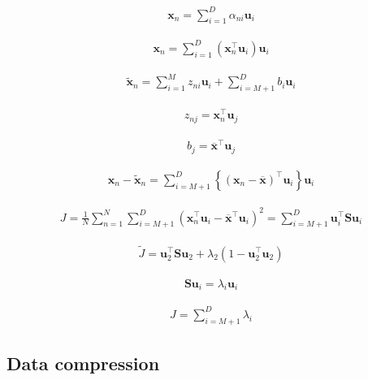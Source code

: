 \documentclass{article}
\begin{document}
\begin{align*}
\mathbf{x}_{n}=\sum_{i=1}^{D} \alpha_{n i} \mathbf{u}_{i} \tag{16.8}
\end{align*}

\begin{align*}
\mathbf{x}_{n}=\sum_{i=1}^{D}\left(\mathbf{x}_{n}^{\top} \mathbf{u}_{i}\right) \mathbf{u}_{i} \tag{16.9}
\end{align*}

\begin{align*}
\widetilde{\mathbf{x}}_{n}=\sum_{i=1}^{M} z_{n i} \mathbf{u}_{i}+\sum_{i=M+1}^{D} b_{i} \mathbf{u}_{i} \tag{16.10}
\end{align*}

\begin{align*}
z_{n j}=\mathbf{x}_{n}^{\top} \mathbf{u}_{j} \tag{16.12}
\end{align*}

\begin{align*}
b_{j}=\overline{\mathbf{x}}^{\top} \mathbf{u}_{j} \tag{16.13}
\end{align*}

\begin{align*}
\mathbf{x}_{n}-\widetilde{\mathbf{x}}_{n}=\sum_{i=M+1}^{D}\left\{\left(\mathbf{x}_{n}-\overline{\mathbf{x}}\right)^{\top} \mathbf{u}_{i}\right\} \mathbf{u}_{i} \tag{16.14}
\end{align*}

\begin{align*}
J=\frac{1}{N} \sum_{n=1}^{N} \sum_{i=M+1}^{D}\left(\mathbf{x}_{n}^{\top} \mathbf{u}_{i}-\overline{\mathbf{x}}^{\top} \mathbf{u}_{i}\right)^{2}=\sum_{i=M+1}^{D} \mathbf{u}_{i}^{\top} \mathbf{S} \mathbf{u}_{i} \tag{16.15}
\end{align*}

\begin{align*}
\widetilde{J}=\mathbf{u}_{2}^{\top} \mathbf{S} \mathbf{u}_{2}+\lambda_{2}\left(1-\mathbf{u}_{2}^{\top} \mathbf{u}_{2}\right) \tag{16.16}
\end{align*}

\begin{align*}
\mathbf{S} \mathbf{u}_{i}=\lambda_{i} \mathbf{u}_{i} \tag{16.17}
\end{align*}

\begin{align*}
J=\sum_{i=M+1}^{D} \lambda_{i} \tag{16.18}
\end{align*}

\subsection{Data compression}
\end{document}
